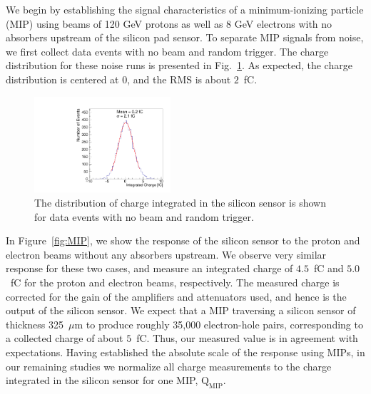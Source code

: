 \documentclass[12pt]{article}
\begin{document}
{We begin by establishing the signal characteristics of a minimum-ionizing
particle (MIP) using beams of 120 GeV protons as well as 8 GeV electrons with no
absorbers upstream of the silicon pad sensor. To separate MIP signals from
noise, we first collect data events with no beam and random trigger. The charge
distribution for these noise runs is presented in Fig.~\ref{fig:noise}. As expected,
the charge distribution is centered at $0$, and the RMS is about
$2$~fC. 

\begin{figure}[htbp] 
\centering
\includegraphics[width=0.45\textwidth]{plots/NoiseNoBeam_charge.pdf} 
\caption{The distribution of charge integrated in the silicon sensor is shown for data events with no beam and random trigger. } 
\label{fig:noise} 
\end{figure} 

In Figure~\ref{fig:MIP}, we show the response of the silicon sensor to the
proton and electron beams without any absorbers upstream. We observe very
similar response for these two cases, and measure an integrated charge of
$4.5$~fC and $5.0$~fC for the proton and electron beams, respectively. The
measured charge is corrected for the gain of the amplifiers and attenuators
used, and hence is the output of the silicon sensor. We expect that a MIP traversing
a silicon sensor of thickness 325~$\mu$m to produce roughly 35,000 electron-hole
pairs, corresponding to a collected charge of about $5$~fC. Thus, our measured value is
in agreement with expectations. Having established the absolute scale of
the  response using MIPs, in our remaining studies we normalize all
charge measurements to the charge integrated in the silicon sensor for one MIP, 
$\mathrm{Q}_{\mathrm{MIP}}$. 

}
\end{document}
